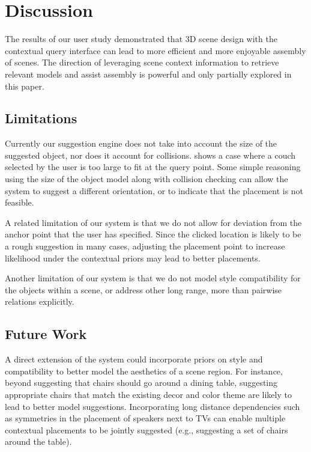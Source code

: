 \documentclass{sigchi}
\begin{document}
\section{Discussion}

The results of our user study demonstrated that 3D scene design with the \SceneSuggest contextual query interface can lead to more efficient and more enjoyable assembly of scenes.  The direction of leveraging scene context information to retrieve relevant models and assist assembly is powerful and only partially explored in this paper.

\subsection{Limitations}

Currently our suggestion engine does not take into account the size of the suggested object, nor does it account for collisions.   shows a case where a couch selected by the user is too large to fit at the query point.  Some simple reasoning using the size of the object model along with collision checking can allow the system to suggest a different orientation, or to indicate that the placement is not feasible.

A related limitation of our system is that we do not allow for deviation from the anchor point that the user has specified.  Since the clicked location is likely to be a rough suggestion in many cases, adjusting the placement point to increase likelihood under the contextual priors may lead to better placements.

Another limitation of our system is that we do not model style compatibility for the objects within a scene, or address other long range, more than pairwise relations explicitly.

\subsection{Future Work}

A direct extension of the \SceneSuggest system could incorporate priors on style and compatibility to better model the aesthetics of a scene region.  For instance, beyond suggesting that chairs should go around a dining table, suggesting appropriate chairs that match the existing decor and color theme are likely to lead to better model suggestions.  Incorporating long distance dependencies such as symmetries in the placement of speakers next to TVs can enable multiple contextual placements to be jointly suggested (e.g., suggesting a set of chairs around the table).
\end{document}
